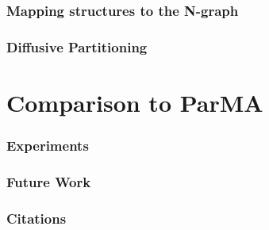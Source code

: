 \documentclass{beamer}
\begin{document}
\begin{frame}
  \frametitle{Mapping structures to the N-graph}
\end{frame}

\begin{frame}
  \frametitle{Diffusive Partitioning}
\end{frame}


\section{Comparison to ParMA}

\begin{frame}
  \frametitle{Experiments}
\end{frame}


\begin{frame}
  \frametitle{Future Work}
\end{frame}

\begin{frame}
  \frametitle{Citations}
\end{frame}
  
\end{document}

